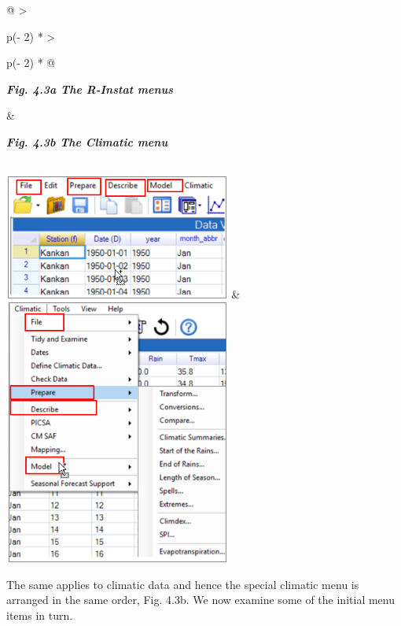 \documentclass[
  letterpaper,
  DIV=11,
  numbers=noendperiod]{scrreprt}
\begin{document}
\begin{longtable}[]{@{}
  >{\raggedright\arraybackslash}p{(\columnwidth - 2\tabcolsep) * }
  >{\raggedright\arraybackslash}p{(\columnwidth - 2\tabcolsep) * }@{}}
\toprule\noalign{}
\begin{minipage}[b]{\linewidth}\raggedright
\textbf{\emph{Fig. 4.3a The R-Instat menus}}
\end{minipage} & \begin{minipage}[b]{\linewidth}\raggedright
\textbf{\emph{Fig. 4.3b The Climatic menu}}
\end{minipage} \\
\midrule\noalign{}
\endhead
\bottomrule\noalign{}
\endlastfoot
\includegraphics[width=2.93274in,height=1.61806in]{figures/Fig4.3a.png}
&
\includegraphics[width=2.94928in,height=3.43809in]{figures/Fig4.3b.png} \\
\end{longtable}

The same applies to climatic data and hence the special climatic menu is
arranged in the same order, Fig. 4.3b. We now examine some of the
initial menu items in turn.
\end{document}
